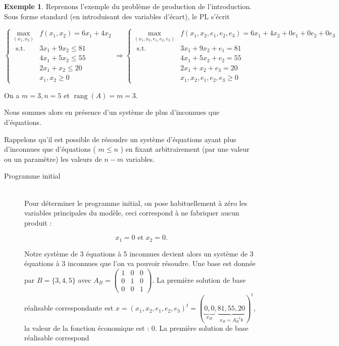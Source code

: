 \documentclass[a4paper,12pt,openany]{book}
\theoremstyle{plain}
\theoremstyle{definition}
\newtheorem{exemple}[theorem]{Exemple}
\theoremstyle{remark}
\theoremstyle{nbstyle}
\begin{document}
	\begin{exemple}
		Reprenons l'exemple du problème de production de l'introduction. Sous forme standard (en introduisant des variables d'écart), le PL s'écrit
		
		$$
		\left\{\begin{array}{rl} 
		\displaystyle\max_{( x_{1} , x_{2} )} & f ( x_{1} , x_{2} ) = 6 x_{1} + 4 x_{2}  \\
		\text { s.t. }  & 3 x_{1} + 9 x_{2} \leq 81  \\
		& 4 x_{1} + 5 x_{2} \leq 55  \\
		& 2 x_{1} + x_{2} \leq 20  \\
		& x_{1} , x_{2} \geq 0 
		\end{array} \right. \Longrightarrow \left\{\begin{array}{rl} 
		\displaystyle\max_{( x_{1} , x_{2} , e_{1} , e_{2} , e_{3} )} & f ( x_{1} , x_{2} , e_{1} , e_{2} , e_{3} ) = 6 x_{1} + 4 x_{2} + 0 e_{1} + 0 e_{2} + 0 e_{3}  \\
		\text { s.t. } & 3 x_{1} + 9 x_{2} + e_{1} = 81  \\
		& 4 x_{1} + 5 x_{2} + e_{2} = 55  \\
		& 2 x_{1} + x_{2} + e_{3} = 20  \\
		& x_{1} , x_{2} , e_{1} , e_{2} , e_{3} \geq 0 
		\end{array} \right.
		$$
		
		On a $m=3, n=5$ et $\operatorname{rang}(A)=m=3$.
		
		Nous sommes alors en présence d'un système de plus d'inconnues que d'équations.
		
		Rappelons qu'il est possible de résoudre un système d'équations ayant plus d'inconnues que d'équations ( $m \leq n$ ) en fixant arbitrairement (par une valeur ou un paramètre) les valeurs de $n-m$ variables.
		
		\begin{description}
			\item[Programme initial] \quad\\	
			Pour déterminer le programme initial, on pose habituellement à zéro les variables principales du modèle, ceci correspond à ne fabriquer aucun produit :
			
			$$
			x_{1}=0 \text { et } x_{2}=0 .
			$$
			
			Notre système de 3 équations à 5 inconnues devient alors un système de 3 équations à 3 inconnues que l'on va pouvoir résoudre. Une base est donnée par $B=\{3,4,5\}$ avec $A_{B}=\left(\begin{array}{lll}1 & 0 & 0 \\ 0 & 1 & 0 \\ 0 & 0 & 1\end{array}\right)$. La première solution de base réalisable correspondante est $x=\left(x_{1}, x_{2}, e_{1}, e_{2}, e_{3}\right)^{t}=(\underbrace{0,0}_{x_{H}}, \underbrace{81,55,20}_{x_{B}=A_{B}^{-1} b})^{t}$, la valeur de la fonction économique est : 0. La première solution de base réalisable correspond
			

\end{description}
\end{exemple}
\end{document}
